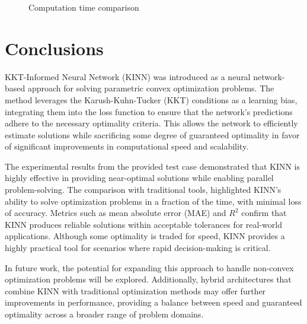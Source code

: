 \documentclass[
]{article}
\begin{document}
\begin{figure}


\caption{\label{fig-times}Computation time comparison}

\end{figure}%

\section{Conclusions}\label{conclusions}

KKT-Informed Neural Network (KINN) was introduced as a neural
network-based approach for solving parametric convex optimization
problems. The method leverages the Karush-Kuhn-Tucker (KKT) conditions
as a learning bias, integrating them into the loss function to ensure
that the network's predictions adhere to the necessary optimality
criteria. This allows the network to efficiently estimate solutions
while sacrificing some degree of guaranteed optimality in favor of
significant improvements in computational speed and scalability.

The experimental results from the provided test case demonstrated that
KINN is highly effective in providing near-optimal solutions while
enabling parallel problem-solving. The comparison with traditional
tools, highlighted KINN's ability to solve optimization problems in a
fraction of the time, with minimal loss of accuracy. Metrics such as
mean absolute error (MAE) and \(R^2\) confirm that KINN produces
reliable solutions within acceptable tolerances for real-world
applications. Although some optimality is traded for speed, KINN
provides a highly practical tool for scenarios where rapid
decision-making is critical.

In future work, the potential for expanding this approach to handle
non-convex optimization problems will be explored. Additionally, hybrid
architectures that combine KINN with traditional optimization methods
may offer further improvements in performance, providing a balance
between speed and guaranteed optimality across a broader range of
problem domains.


  
\end{document}
